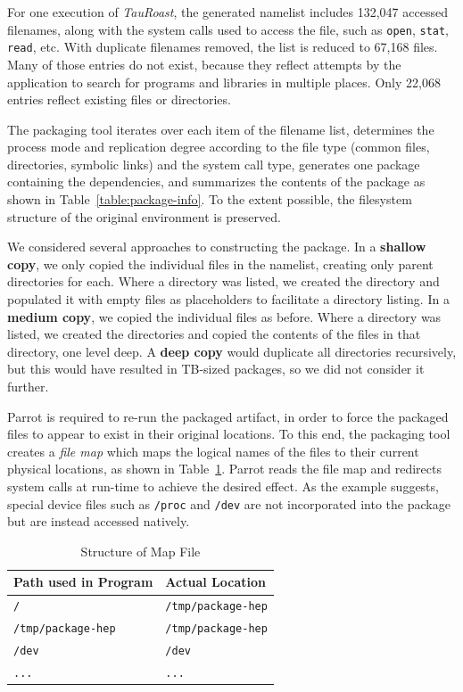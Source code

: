 For one execution of \emph{TauRoast}, the generated namelist includes 132,047 accessed filenames,
along with the system calls used to access the file, such as {\tt open}, {\tt stat}, {\tt read}, etc.
With duplicate filenames removed, the list is reduced to 67,168 files.
Many of those entries do not exist, because they reflect attempts
by the application to search for programs and libraries in multiple places.
Only 22,068 entries reflect existing files or directories.

The packaging tool iterates over each item of the filename list, determines the process
mode and replication degree according to the file type (common files,
directories, symbolic links) and the system call type, generates one package
containing the dependencies, and summarizes the contents of the package
as shown in Table~\ref{table:package-info}.  To the extent possible,
the filesystem structure of the original environment is preserved.

We considered several approaches to constructing the package.
In a {\bf shallow copy}, we only copied the individual files in the namelist,
creating only parent directories for each.  Where a directory was listed,
we created the directory and populated it with empty files as placeholders
to facilitate a directory listing.  In a {\bf medium copy}, we copied the
individual files as before.  Where a directory was listed, we created
the directories and copied the contents of the files in that directory,
one level deep.  A {\bf deep copy} would duplicate all directories recursively,
but this would have resulted in TB-sized packages, so we did not consider
it further.

Parrot is required to re-run the packaged artifact, in order to force
the packaged files to appear to exist in their original locations.
To this end, the packaging tool creates a \emph{file map} which maps
the logical names of the files to their current physical locations, as shown in Table~\ref{table:map-file}.
Parrot reads the file map and redirects system calls at run-time to achieve the desired effect.
As the example suggests, special device files such as {\tt /proc} and {\tt /dev}
are not incorporated into the package but are instead accessed natively.

\begin{table}
    \centering
    \begin{tabular}{ll}
    \hline
    \bf Path used in Program & \bf Actual Location \\ \hline
    {\tt /} & {\tt /tmp/package-hep} \\ \hline
    {\tt /tmp/package-hep} & {\tt /tmp/package-hep} \\ \hline
    {\tt /dev} & {\tt /dev} \\ \hline
    {\tt ...} & {\tt ...}\\ \hline
    \end{tabular}
    \caption{Structure of Map File}
    \label{table:map-file}
\end{table}

